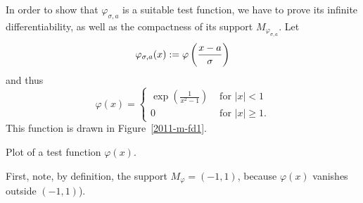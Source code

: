 {\color{OliveGreen}
\bproof
In order to show that $\varphi_{\sigma ,a}$ is a suitable test function,
we have to prove its infinite differentiability, as well as the compactness of its support
$M_{\varphi_{\sigma, a}}$.
Let
$$
   \varphi_{\sigma,a}(x):=\varphi\left({ x- a
   \over\sigma}\right)
$$
and thus
\begin{equation}
   \varphi(x)=
\begin{cases}
\exp \left( \frac{1}{x^2-1}\right) &\textrm{ for } |x|<1\\
                 0 &\textrm{ for }|x|\geq 1
.
\end{cases}
\label{2019-m-ch-di-tf1-mod}
\end{equation}
This function is drawn in Figure~\ref{2011-m-fd1}.
{\color{black}
\begin{marginfigure}
\begin{center}
\end{center}
\caption{Plot of a test function $\varphi(x)$. }
\label{2011-m-fd1}
\end{marginfigure}
}


First, note, by definition, the support  $M_\varphi=(-1,1)$,
because $\varphi (x)$   vanishes outside  $(-1,1)$).

}
